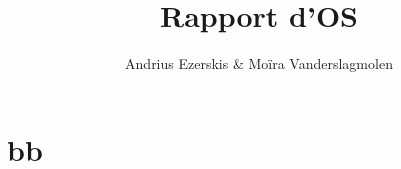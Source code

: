 \documentclass{article}
\title{Rapport d'OS}
\author{Andrius Ezerskis \& Moïra Vanderslagmolen}
\begin{document}

\section{bb}
\end{document}
